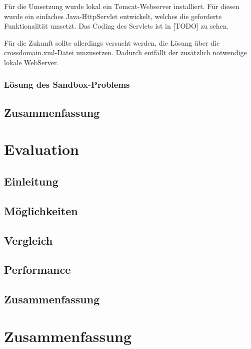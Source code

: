 Für die Umsetzung wurde lokal ein Tomcat-Webserver installiert. Für diesen wurde ein einfaches Java-HttpServlet entwickelt, welches die geforderte Funktionalität umsetzt. Das Coding des Servlets ist in [TODO] zu sehen.

Für die Zukunft sollte allerdings versucht werden, die Lösung über die crossdomain.xml-Datei umzusetzen. Dadurch entfällt der zusätzlich notwendige lokale WebServer.

\subsection{Lösung des Sandbox-Problems}

\section{Zusammenfassung}

\chapter{Evaluation}
\section{Einleitung}
\section{Möglichkeiten}
\section{Vergleich}
\section{Performance}
\section{Zusammenfassung}

\chapter{Zusammenfassung}


\seAppendix{}

\setcounter{page}{8}

